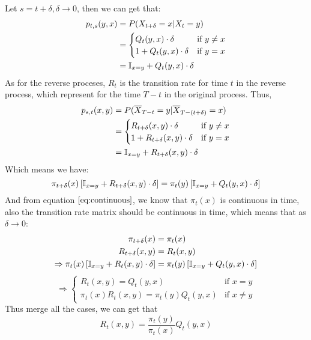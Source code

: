 \begin{homeworkProblem}
Let $s=t+\delta, \delta\to 0$, then we can get that:
\begin{align*}
p_{t,s}(y,x) &= P(X_{t+\delta}=x|X_t=y) \\
&= \begin{cases}
Q_t(y,x)\cdot\delta & \text{if } y\neq x \\
1 + Q_t(y,x)\cdot\delta & \text{if } y=x
\end{cases} \\
&= \mathbb{I}_{x=y} + Q_t(y,x)\cdot\delta
\end{align*}
As for the reverse proceses, $R_t$ is the transition rate for time $t$ in the reverse process, which represent for the time $T-t$ in the original process. Thus,
\begin{align*}
p_{s,t}(x,y) &= P(\overline{X}_{T-t}=y|\overline{X}_{T-(t+\delta)}=x) \\
&= \begin{cases}
R_{t+\delta}(x,y)\cdot\delta & \text{if } y\neq x \\
1 + R_{t+\delta}(x,y)\cdot\delta & \text{if } y=x
\end{cases} \\
&= \mathbb{I}_{x=y} + R_{t+\delta}(x,y)\cdot\delta
\end{align*}
Which means we have:
$$\pi_{t+\delta}(x)\left[\mathbb{I}_{x=y} + R_{t+\delta}(x,y)\cdot\delta\right] = \pi_t(y)\left[\mathbb{I}_{x=y} + Q_t(y,x)\cdot\delta\right]$$
And from equation $\ref{eq:continuous}$, we know that $\pi_t(x)$ is continuous in time, also the transition rate matrix should be continuous in time, which means that as $\delta\to 0$:
\begin{align*}
\pi_{t+\delta}(x) &= \pi_t(x) \\
R_{t+\delta}(x,y) &= R_t(x,y) \\
\Rightarrow \pi_{t}(x)\left[\mathbb{I}_{x=y} + R_{t}(x,y)\cdot\delta\right] &= \pi_t(y)\left[\mathbb{I}_{x=y} + Q_t(y,x)\cdot\delta\right]
\end{align*}
$$\Rightarrow \begin{cases}
R_t(x,y) = Q_t(y,x) & \text{if } x=y \\
\pi_t(x)R_t(x,y) = \pi_t(y)Q_t(y,x) & \text{if } x\neq y
\end{cases}$$
Thus merge all the cases, we can get that
$$R_t(x, y)=\frac{\pi_t(y)}{\pi_t(x)} Q_t(y, x)$$

\end{homeworkProblem}

\newpage